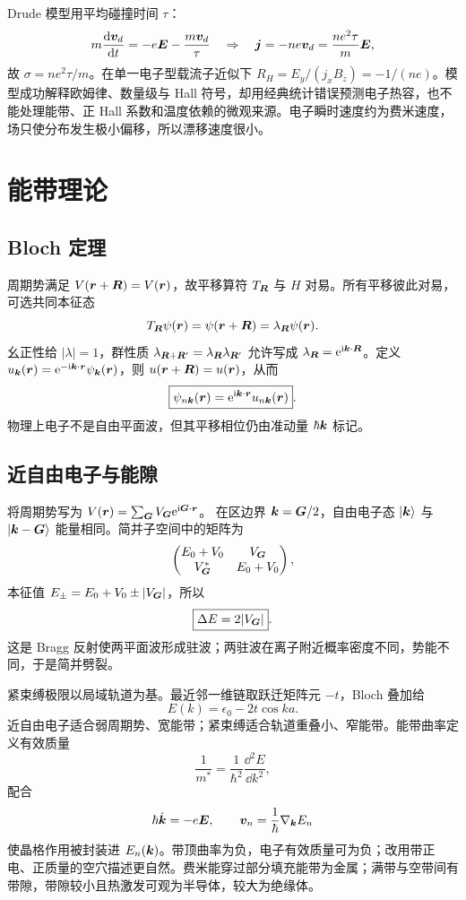 Drude 模型用平均碰撞时间 $\tau$：
\[
m\frac{\mathrm d \bm{v}_d}{\mathrm d t}=-e\bm{E}-\frac{m\bm{v}_d}{\tau}
\quad\Rightarrow\quad
\bm{j}=-ne\bm{v}_d=\frac{ne^2\tau}{m}\bm{E},
\]
故 $\sigma=ne^2\tau/m$。在单一电子型载流子近似下
$R_H=E_y/(j_xB_z)=-1/(ne)$。模型成功解释欧姆律、数量级与 Hall 符号，却用经典统计错误预测电子热容，也不能处理能带、正 Hall 系数和温度依赖的微观来源。电子瞬时速度约为费米速度，场只使分布发生极小偏移，所以漂移速度很小。

\section{能带理论}
\subsection{Bloch 定理}
周期势满足 $V(\bm{r}+\bm{R})=V(\bm{r})$，故平移算符
$T_{\bm{R}}$ 与 $H$ 对易。所有平移彼此对易，可选共同本征态
\[
T_{\bm{R}}\psi(\bm{r})=\psi(\bm{r}+\bm{R})=\lambda_{\bm{R}}\psi(\bm{r}).
\]
幺正性给 $|\lambda|=1$，群性质
$\lambda_{\bm{R}+\bm{R}'}=\lambda_{\bm{R}}\lambda_{\bm{R}'}$ 允许写成
$\lambda_{\bm{R}}=\mathrm e^{\mathrm i\bm{k}\cdot\bm{R}}$。定义
$u_{\bm{k}}(\bm{r})=\mathrm e^{-\mathrm i\bm{k}\cdot\bm{r}}\psi_{\bm{k}}(\bm{r})$，则
$u(\bm{r}+\bm{R})=u(\bm{r})$，从而
\[
\boxed{\psi_{n\bm{k}}(\bm{r})=\mathrm e^{\mathrm i\bm{k}\cdot\bm{r}}u_{n\bm{k}}(\bm{r})}.
\]
物理上电子不是自由平面波，但其平移相位仍由准动量 $\hbar\bm{k}$ 标记。

\subsection{近自由电子与能隙}
将周期势写为 $V(\bm{r})=\sum_{\bm{G}}V_{\bm{G}}\mathrm e^{\mathrm i\bm{G}\cdot\bm{r}}$。
在区边界 $\bm{k}=\bm{G}/2$，自由电子态
$|\bm{k}\rangle$ 与 $|\bm{k}-\bm{G}\rangle$ 能量相同。简并子空间中的矩阵为
\[
\begin{pmatrix}E_0+V_0&V_{\bm{G}}\\V_{\bm{G}}^*&E_0+V_0\end{pmatrix},
\]
本征值 $E_\pm=E_0+V_0\pm|V_{\bm{G}}|$，所以
\[
\boxed{\Delta E=2|V_{\bm{G}}|}.
\]
这是 Bragg 反射使两平面波形成驻波；两驻波在离子附近概率密度不同，势能不同，于是简并劈裂。

紧束缚极限以局域轨道为基。最近邻一维链取跃迁矩阵元 $-t$，Bloch 叠加给
\[
\boxed{E(k)=\epsilon_0-2t\cos ka}.
\]
近自由电子适合弱周期势、宽能带；紧束缚适合轨道重叠小、窄能带。能带曲率定义有效质量
\[
\frac1{m^*}=\frac1{\hbar^2}\frac{\dd^2E}{\dd k^2},
\]
配合
\[
\hbar\dot{\bm{k}}=-e\bm{E},\qquad
\bm{v}_n=\frac1\hbar\nabla_{\bm{k}}E_n
\]
使晶格作用被封装进 $E_n(\bm{k})$。带顶曲率为负，电子有效质量可为负；改用带正电、正质量的空穴描述更自然。费米能穿过部分填充能带为金属；满带与空带间有带隙，带隙较小且热激发可观为半导体，较大为绝缘体。

